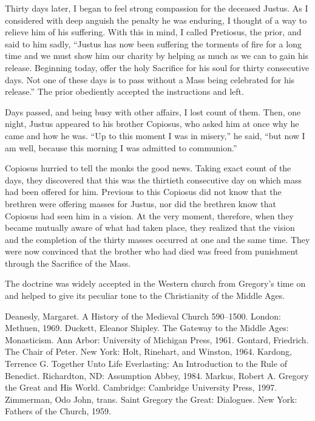 \begin{blockquote}
Thirty days later, I began to feel strong compassion for the deceased Justus. As I considered with
deep anguish the penalty he was enduring, I thought of a way to relieve him of his suffering. With
this in mind, I called Pretiosus, the prior, and said to him sadly, “Justus has now been suffering
the torments of fire for a long time and we must show him our charity by helping as much as we can
to gain his release. Beginning today, offer the holy Sacrifice for his soul for thirty consecutive
days. Not one of these days is to pass without a Mass being celebrated for his release.” The prior
obediently accepted the instructions and left.

Days passed, and being busy with other affairs, I lost count of them. Then, one night, Justus
appeared to his brother Copiosus, who asked him at once why he came and how he was. “Up to this
moment I was in misery,” he said, “but now I am well, because this morning I was admitted to
communion.”
\end{blockquote}

Copiosus hurried to tell the monks the good news. Taking exact count of the days, they discovered
that this was the thirtieth consecutive day on which mass had been offered for him. Previous to this
Copiosus did not know that the brethren were offering masses for Justus, nor did the brethren know
that Copiosus had seen him in a vision. At the very moment, therefore, when they became mutually
aware of what had taken place, they realized that the vision and the completion of the thirty masses
occurred at one and the same time. They were now convinced that the brother who had died was freed
from punishment through the Sacrifice of the Mass.

The doctrine was widely accepted in the Western church from Gregory’s time on and helped to give its
peculiar tone to the Christianity of the Middle Ages.

\begin{readinglist}
\entry Deanesly, Margaret. A History of the Medieval Church 590–1500. London: Methuen, 1969.
\entry Duckett, Eleanor Shipley. The Gateway to the Middle Ages: Monasticism. Ann Arbor: University
  of Michigan Press, 1961.
\entry Gontard, Friedrich. The Chair of Peter. New York: Holt, Rinehart, and Winston, 1964.
\entry *Kardong, Terrence G. Together Unto Life Everlasting: An Introduction to the Rule of
  Benedict. Richardton, ND: Assumption Abbey, 1984.
\entry *Markus, Robert A. Gregory the Great and His World. Cambridge: Cambridge University Press,
  1997.
\entry Zimmerman, Odo John, trans. Saint Gregory the Great: Dialogues. New York: Fathers of the
  Church, 1959.
\end{readinglist}
